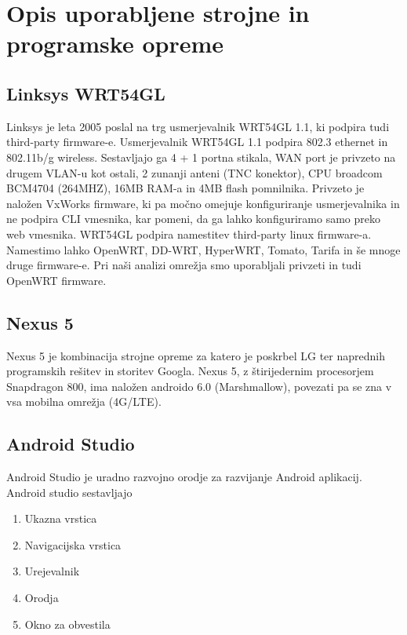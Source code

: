 \documentclass[11pt,a4paper,slovene]{article}
\begin{document}
\section{Opis uporabljene strojne in programske opreme}

\subsection{Linksys WRT54GL \cite{wrt}}
Linksys je leta 2005 poslal na trg usmerjevalnik WRT54GL 1.1, ki podpira tudi third-party firmware-e. Usmerjevalnik WRT54GL 1.1 podpira 802.3 ethernet in 802.11b/g wireless. Sestavljajo ga 4 + 1 portna stikala, WAN port je privzeto na drugem VLAN-u kot ostali, 2 zunanji anteni (TNC konektor), CPU broadcom BCM4704 (264MHZ), 16MB RAM-a in 4MB flash pomnilnika.\newline
Privzeto je naložen VxWorks firmware, ki pa močno omejuje konfiguriranje usmerjevalnika in ne podpira CLI vmesnika, kar pomeni, da ga lahko konfiguriramo samo preko web vmesnika. WRT54GL podpira namestitev third-party linux firmware-a. Namestimo lahko OpenWRT, DD-WRT, HyperWRT, Tomato, Tarifa in še mnoge druge firmware-e. Pri naši analizi omrežja smo uporabljali privzeti in tudi OpenWRT firmware.


\subsection{Nexus 5 \cite{nexus}}
Nexus 5 je kombinacija strojne opreme za katero je poskrbel LG ter naprednih programskih rešitev in storitev Googla. Nexus 5, z štirijedernim procesorjem Snapdragon 800, ima naložen androido 6.0 (Marshmallow), povezati pa se zna v vsa mobilna omrežja (4G/LTE).

\subsection{Android Studio \cite{android}}
Android Studio je uradno razvojno orodje za razvijanje Android aplikacij. Android studio sestavljajo
\begin{enumerate}
\item Ukazna vrstica
\item Navigacijska vrstica
\item Urejevalnik
\item Orodja
\item Okno za obvestila
\end{enumerate} 
\end{document}

